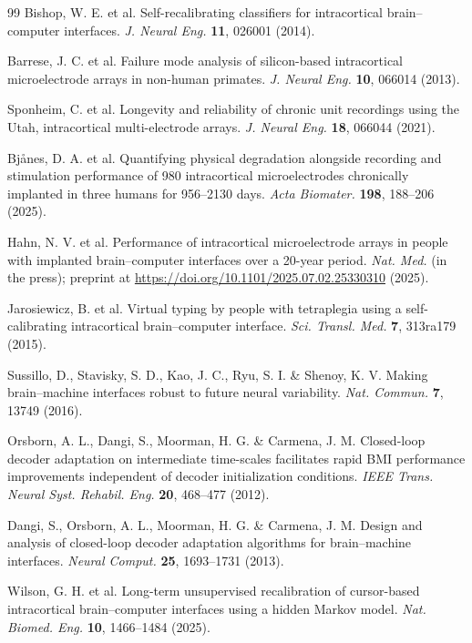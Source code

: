 \begin{thebibliography}{99}
 Bishop, W. E. et al. Self-recalibrating classifiers for intracortical brain--computer interfaces. \textit{J. Neural Eng.} \textbf{11}, 026001 (2014).

 Barrese, J. C. et al. Failure mode analysis of silicon-based intracortical microelectrode arrays in non-human primates. \textit{J. Neural Eng.} \textbf{10}, 066014 (2013).

 Sponheim, C. et al. Longevity and reliability of chronic unit recordings using the Utah, intracortical multi-electrode arrays. \textit{J. Neural Eng.} \textbf{18}, 066044 (2021).

 Bj{\aa}nes, D. A. et al. Quantifying physical degradation alongside recording and stimulation performance of 980 intracortical microelectrodes chronically implanted in three humans for 956--2130 days. \textit{Acta Biomater.} \textbf{198}, 188--206 (2025).

 Hahn, N. V. et al. Performance of intracortical microelectrode arrays in people with implanted brain--computer interfaces over a 20-year period. \textit{Nat. Med.} (in the press); preprint at \url{https://doi.org/10.1101/2025.07.02.25330310} (2025).

 Jarosiewicz, B. et al. Virtual typing by people with tetraplegia using a self-calibrating intracortical brain--computer interface. \textit{Sci. Transl. Med.} \textbf{7}, 313ra179 (2015).

 Sussillo, D., Stavisky, S. D., Kao, J. C., Ryu, S. I. \& Shenoy, K. V. Making brain--machine interfaces robust to future neural variability. \textit{Nat. Commun.} \textbf{7}, 13749 (2016).

 Orsborn, A. L., Dangi, S., Moorman, H. G. \& Carmena, J. M. Closed-loop decoder adaptation on intermediate time-scales facilitates rapid BMI performance improvements independent of decoder initialization conditions. \textit{IEEE Trans. Neural Syst. Rehabil. Eng.} \textbf{20}, 468--477 (2012).

 Dangi, S., Orsborn, A. L., Moorman, H. G. \& Carmena, J. M. Design and analysis of closed-loop decoder adaptation algorithms for brain--machine interfaces. \textit{Neural Comput.} \textbf{25}, 1693--1731 (2013).

 Wilson, G. H. et al. Long-term unsupervised recalibration of cursor-based intracortical brain--computer interfaces using a hidden Markov model. \textit{Nat. Biomed. Eng.} \textbf{10}, 1466--1484 (2025).


\end{thebibliography}
